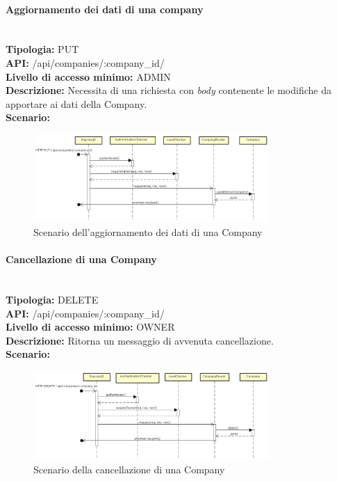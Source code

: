 \newpage
\paragraph{Aggiornamento dei dati di una company}\mbox{}\\
\textbf{Tipologia:} PUT \\
\textbf{API:} /api/companies/:company\_id/ \\
\textbf{Livello di accesso minimo:} ADMIN \\
\textbf{Descrizione:} Necessita di una richiesta con \textit{body} contenente le modifiche da apportare ai dati della Company. \\
\textbf{Scenario:} 
\begin{figure}[H]
\centering
\includegraphics[width=0.8\textwidth]{res/sections/backend/sequence/(PUT)company.png}
\caption{Scenario dell'aggiornamento dei dati di una Company}
\end{figure}

\newpage
\paragraph{Cancellazione di una Company}\mbox{}\\
\textbf{Tipologia:} DELETE \\
\textbf{API:} /api/companies/:company\_id/ \\
\textbf{Livello di accesso minimo:} OWNER \\
\textbf{Descrizione:} Ritorna un messaggio di avvenuta cancellazione. \\
\textbf{Scenario:} 
\begin{figure}[H]
\centering
\includegraphics[width=0.8\textwidth]{res/sections/backend/sequence/(DELETE)company.png}
\caption{Scenario della cancellazione di una Company}
\end{figure}

